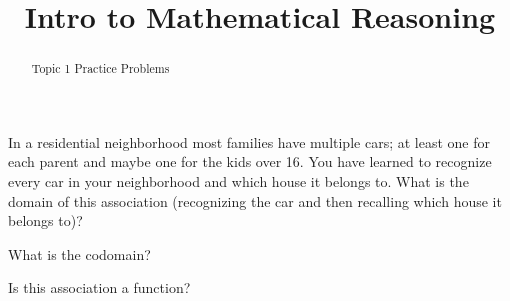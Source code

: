 \documentclass{ximera}
\title{Intro to Mathematical Reasoning}
\begin{document}
\begin{abstract}
Topic 1 Practice Problems
\end{abstract}
\maketitle

%





\begin{problem}
    In a residential neighborhood most families have multiple cars; at least one for each parent and maybe one for the kids over 16. You have learned to recognize every car in your neighborhood and which house it belongs to. What is the domain of this association (recognizing the car and then recalling which house it belongs to)?
    \begin{multipleChoice}
    \end{multipleChoice}
    \begin{problem}
        What is the codomain?
        \begin{multipleChoice}
        \end{multipleChoice}
        \begin{problem}
            Is this association a function?
            \begin{multipleChoice}
            \end{multipleChoice}
        \end{problem}
    \end{problem}
\end{problem}
\end{document}
